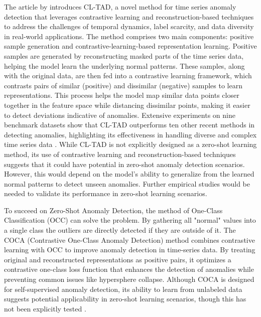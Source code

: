 The article by  introduces CL-TAD, a novel method for time series anomaly detection that leverages contrastive learning and reconstruction-based techniques to address the challenges of temporal dynamics, label scarcity, and data diversity in real-world applications. The method comprises two main components: positive sample generation and contrastive-learning-based representation learning. Positive samples are generated by reconstructing masked parts of the time series data, helping the model learn the underlying normal patterns. These samples, along with the original data, are then fed into a contrastive learning framework, which contrasts pairs of similar (positive) and dissimilar (negative) samples to learn representations. This process helps the model map similar data points closer together in the feature space while distancing dissimilar points, making it easier to detect deviations indicative of anomalies. Extensive experiments on nine benchmark datasets show that CL-TAD outperforms ten other recent methods in detecting anomalies, highlighting its effectiveness in handling diverse and complex time series data .
While CL-TAD is not explicitly designed as a zero-shot learning method, its use of contrastive learning and reconstruction-based techniques suggests that it could have potential in zero-shot anomaly detection scenarios. However, this would depend on the model's ability to generalize from the learned normal patterns to detect unseen anomalies. Further empirical studies would be needed to validate its performance in zero-shot learning scenarios.

To succeed on Zero-Shot Anomaly Detection, the method of One-Class Classification (OCC) can solve the problem. %
By gathering all "normal" values into a single class the outliers are directly detected if they are outside of it.
The COCA (Contrastive One-Class Anomaly Detection) method combines contrastive learning with OCC to improve anomaly detection in time-series data. By treating original and reconstructed representations as positive pairs, it optimizes a contrastive one-class loss function that enhances the detection of anomalies while preventing common issues like hypersphere collapse. Although COCA is designed for self-supervised anomaly detection, its ability to learn from unlabeled data suggests potential applicability in zero-shot learning scenarios, though this has not been explicitly tested .

